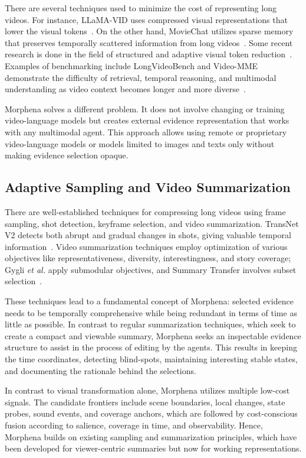 \documentclass[conference]{IEEEtran}
\begin{document}
There are several techniques used to minimize the cost of representing long videos. For instance, LLaMA-VID uses compressed visual representations that lower the visual tokens~\cite{li2023llamavid}. On the other hand, MovieChat utilizes sparse memory that preserves temporally scattered information from long videos~\cite{song2024moviechat}. Some recent research is done in the field of structured and adaptive visual token reduction~\cite{ju2026forestprune,xu2026score}. Examples of benchmarking include LongVideoBench and Video-MME demonstrate the difficulty of retrieval, temporal reasoning, and multimodal understanding as video context becomes longer and more diverse~\cite{wu2024longvideobench,fu2025videomme}.

Morphena solves a different problem. It does not involve changing or training video-language models but creates external evidence representation that works with any multimodal agent. This approach allows using remote or proprietary video-language models or models limited to images and texts only without making evidence selection opaque.

\subsection{Adaptive Sampling and Video Summarization}

There are well-established techniques for compressing long videos using frame sampling, shot detection, keyframe selection, and video summarization. TransNet V2 detects both abrupt and gradual changes in shots, giving valuable temporal information~\cite{soucek2020transnetv2}. Video summarization techniques employ optimization of various objectives like representativeness, diversity, interestingness, and story coverage; Gygli \textit{et al.} apply submodular objectives, and Summary Transfer involves subset selection~\cite{gygli2015submodular,zhang2016summarytransfer}.

These techniques lead to a fundamental concept of Morphena: selected evidence needs to be temporally comprehensive while being redundant in terms of time as little as possible. In contrast to regular summarization techniques, which seek to create a compact and viewable summary, Morphena seeks an inspectable evidence structure to assist in the process of editing by the agents. This results in keeping the time coordinates, detecting blind-spots, maintaining interesting stable states, and documenting the rationale behind the selections.

In contrast to visual transformation alone, Morphena utilizes multiple low-cost signals. The candidate frontiers include scene boundaries, local changes, state probes, sound events, and coverage anchors, which are followed by cost-conscious fusion according to salience, coverage in time, and observability. Hence, Morphena builds on existing sampling and summarization principles, which have been developed for viewer-centric summaries but now for working representations.
\end{document}
